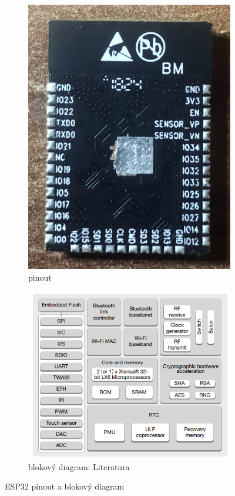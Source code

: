\documentclass[a4paper, 12pt]{report}
\begin{document}
    \begin{figure}[h!]
        \centering
        \begin{subfigure}[b]{0.4\linewidth}
            \includegraphics[width=\linewidth]{images/ESP32_piny}
            \caption{pinout}
        \end{subfigure}
        \begin{subfigure}[b]{0.4\linewidth}
            \includegraphics[width=\linewidth]{images/ESP32_diagram}
            \caption{blokový diagram: Literatura~\cite{ESP32}}
        \end{subfigure}
        \caption{ESP32 pinout a blokový diagram}
        \label{fig:esp32_diagram_pinout}
    \end{figure}
\end{document}
